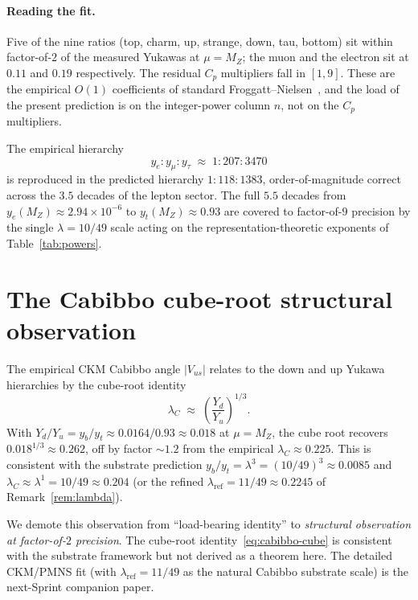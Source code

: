 \documentclass[11pt,reqno]{amsart}
\theoremstyle{plain}
\theoremstyle{definition}
\theoremstyle{remark}
\begin{document}
\paragraph{Reading the fit.}
Five of the nine ratios (top, charm, up, strange, down,
tau, bottom) sit within factor-of-$2$ of the measured Yukawas
at $\mu = M_Z$; the muon and the electron sit at $0.11$ and
$0.19$ respectively. The residual $C_p$ multipliers fall in
$[1, 9]$. These are the empirical $O(1)$ coefficients of
standard Froggatt--Nielsen~\cite{FroggattNielsen1979}, and the
load of the present prediction is on the integer-power column
$n$, not on the $C_{p}$ multipliers.

The empirical hierarchy
\[
  y_{e} : y_{\mu} : y_{\tau}
  \;\approx\; 1 : 207 : 3470
\]
is reproduced in the predicted hierarchy
$1 : 118 : 1383$, order-of-magnitude correct across the
$3.5$ decades of the lepton sector. The full $5.5$ decades from
$y_{e}(M_Z) \approx 2.94 \times 10^{-6}$ to $y_{t}(M_Z) \approx
0.93$ are covered to factor-of-$9$ precision by the single
$\lambda = 10/49$ scale acting on the representation-theoretic
exponents of Table~\ref{tab:powers}.

\section{The Cabibbo cube-root structural observation}\label{sec:cabibbo}

The empirical CKM Cabibbo angle $|V_{us}|$ relates to the down
and up Yukawa hierarchies by the cube-root identity
\begin{equation}
  \lambda_{C} \;\approx\; \left(\frac{Y_{d}}{Y_{u}}\right)^{1/3}.\label{eq:cabibbo-cube}
\end{equation}
With $Y_{d}/Y_{u} = y_{b}/y_{t} \approx 0.0164/0.93 \approx
0.018$ at $\mu = M_Z$, the cube root recovers $0.018^{1/3}
\approx 0.262$, off by factor $\sim 1.2$ from the empirical
$\lambda_C \approx 0.225$. This is consistent with the
substrate prediction $y_{b}/y_{t} = \lambda^{3} = (10/49)^{3}
\approx 0.0085$ and $\lambda_{C} \approx \lambda^{1} = 10/49
\approx 0.204$ (or the refined $\lambda_{\mathrm{ref}} = 11/49
\approx 0.2245$ of Remark~\ref{rem:lambda}).

We demote this observation from ``load-bearing identity''
to \emph{structural observation at factor-of-$2$ precision}.
The cube-root identity~\eqref{eq:cabibbo-cube} is consistent
with the substrate framework but not derived as a theorem
here. The detailed CKM/PMNS fit (with
$\lambda_{\mathrm{ref}} = 11/49$ as the natural Cabibbo
substrate scale) is the next-Sprint companion paper.
\end{document}
